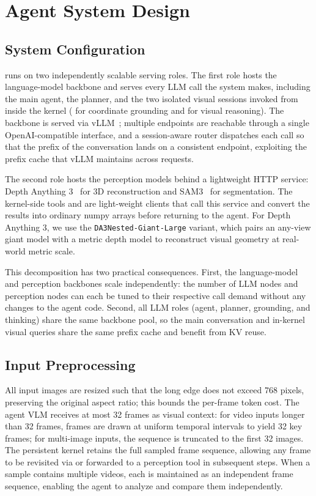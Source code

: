\section{Agent System Design}
\label{app:system}

\subsection{System Configuration}
\label{app:topology}
\ours{} runs on two independently scalable serving roles. The first role hosts the language-model backbone and serves every LLM call the system makes, including the main agent, the planner, and the two isolated visual sessions invoked from inside the kernel ( for coordinate grounding and  for visual reasoning). The backbone is served via vLLM~\citep{kwon2023efficient}; multiple endpoints are reachable through a single OpenAI-compatible interface, and a session-aware router dispatches each call so that the prefix of the conversation lands on a consistent endpoint, exploiting the prefix cache that vLLM maintains across requests.

The second role hosts the perception models behind a lightweight HTTP service: Depth Anything 3~\citep{depthanything3} for 3D reconstruction and SAM3~\citep{carion2025sam} for segmentation. The kernel-side tools  and  are light-weight clients that call this service and convert the results into ordinary numpy arrays before returning to the agent.
For Depth Anything 3, we use the \texttt{DA3Nested-Giant-Large} variant, which pairs an any-view giant model with a metric depth model to reconstruct visual geometry at real-world metric scale.

This decomposition has two practical consequences. First, the language-model and perception backbones scale independently: the number of LLM nodes and perception nodes can each be tuned to their respective call demand without any changes to the agent code. Second, all LLM roles (agent, planner, grounding, and thinking) share the same backbone pool, so the main conversation and in-kernel visual queries share the same prefix cache and benefit from KV reuse.

\subsection{Input Preprocessing}
\label{app:input_preprocess}
All input images are resized such that the long edge does not exceed 768 pixels, preserving the original aspect ratio; this bounds the per-frame token cost. The agent VLM receives at most 32 frames as visual context: for video inputs longer than 32 frames, frames are drawn at uniform temporal intervals to yield 32 key frames; for multi-image inputs, the sequence is truncated to the first 32 images. The persistent kernel retains the full sampled frame sequence, allowing any frame to be revisited via  or forwarded to a perception tool in subsequent steps. When a sample contains multiple videos, each is maintained as an independent frame sequence, enabling the agent to analyze and compare them independently.

